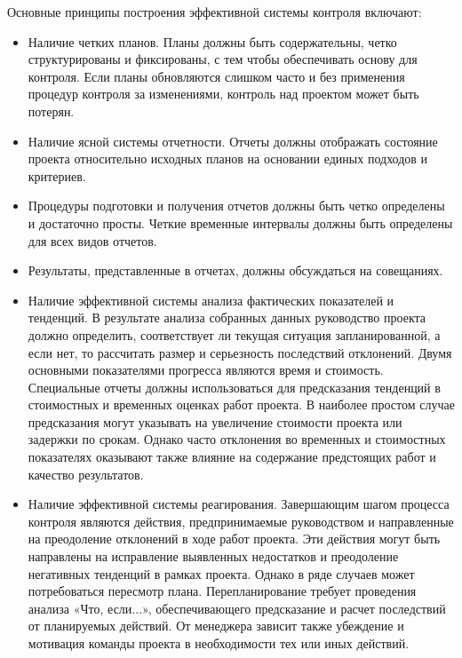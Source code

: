 Основные принципы построения эффективной системы контроля включают:
\begin{itemize}
	\item Наличие четких планов.
Планы должны быть содержательны, четко структурированы и фиксированы, с тем чтобы обеспечивать основу для контроля.
Если планы обновляются слишком часто и без применения процедур контроля за изменениями, контроль над проектом может быть потерян.

\item Наличие ясной системы отчетности.
Отчеты должны отображать состояние проекта относительно исходных планов на основании единых подходов и критериев.

\item Процедуры подготовки и получения отчетов должны быть четко определены и достаточно просты.
Четкие временные интервалы должны быть определены для всех видов отчетов.

\item Результаты, представленные в отчетах, должны обсуждаться на совещаниях.

\item Наличие эффективной системы анализа фактических показателей и тенденций.
В результате анализа собранных данных руководство проекта должно определить, соответствует ли текущая ситуация запланированной, а если нет, то рассчитать размер и серьезность последствий отклонений.
Двумя основными показателями прогресса являются время и стоимость.
Специальные отчеты должны использоваться для предсказания тенденций в стоимостных и временных оценках работ проекта.
В наиболее простом случае предсказания могут указывать на увеличение стоимости проекта или задержки по срокам.
Однако часто отклонения во временных и стоимостных показателях оказывают также влияние на содержание предстоящих работ и качество результатов.


\item Наличие эффективной системы реагирования.
Завершающим шагом процесса контроля являются действия, предпринимаемые руководством и направленные на преодоление отклонений в ходе работ проекта.
Эти действия могут быть направлены на исправление выявленных недостатков и преодоление негативных тенденций в рамках проекта.
Однако в ряде случаев может потребоваться пересмотр плана.
Перепланирование требует проведения анализа «Что, если...», обеспечивающего предсказание и расчет последствий от планируемых действий.
От менеджера зависит также убеждение и мотивация команды проекта в необходимости тех или иных действий.
\end{itemize}

